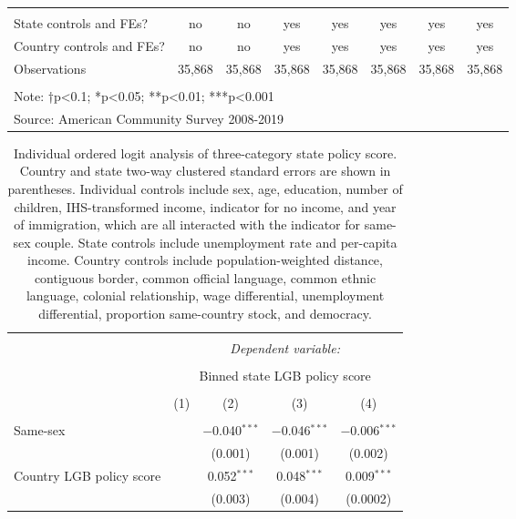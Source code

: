 \documentclass[
  11pt,
]{article}
\begin{document}
\begin{table}[!htbp]
\begin{tabular}{@{\extracolsep{2pt}}lccccccc}
 \hline \\[-1.8ex] 
State controls and FEs? & no & no & yes & yes & yes & yes & yes \\ 
Country controls and FEs? & no & no & yes & yes & yes & yes & yes \\ 
Observations & 35,868 & 35,868 & 35,868 & 35,868 & 35,868 & 35,868 & 35,868 \\ 
\hline 
\hline \\[-1.8ex] 
\multicolumn{8}{l}{Note: †p<0.1; *p<0.05; **p<0.01; ***p<0.001} \\ 
\multicolumn{8}{l}{Source: American Community Survey 2008-2019} \\ 
\end{tabular} 
\end{table}

\begin{table}[!htbp] \centering 
  \caption{Individual ordered logit analysis of three-category state policy score. Country and state two-way clustered standard errors are shown in parentheses. Individual controls include sex, age, education, number of children, IHS-transformed income, indicator for no income, and year of immigration, which are all interacted with the indicator for same-sex couple. State controls include unemployment rate and per-capita income. Country controls include population-weighted distance, contiguous border, common official language, common ethnic language, colonial relationship, wage differential, unemployment differential, proportion same-country stock, and democracy.} 
  \label{tab:ord-full} 
\footnotesize 
\begin{tabular}{@{\extracolsep{5pt}}lcccc} 
\\[-1.8ex]\hline 
\hline \\[-1.8ex] 
 & \multicolumn{4}{c}{\textit{Dependent variable:}} \\ 
\cline{2-5} 
\\[-1.8ex] & \multicolumn{4}{c}{Binned state LGB policy score} \\ 
\\[-1.8ex] & (1) & (2) & (3) & (4)\\ 
\hline \\[-1.8ex] 
 Same-sex &  & $-$0.040$^{***}$ & $-$0.046$^{***}$ & $-$0.006$^{***}$ \\ 
  &  & (0.001) & (0.001) & (0.002) \\ 
  Country LGB policy score &  & 0.052$^{***}$ & 0.048$^{***}$ & 0.009$^{***}$ \\ 
  &  & (0.003) & (0.004) & (0.0002) \\ 

\end{tabular}
\end{table}
\end{document}
